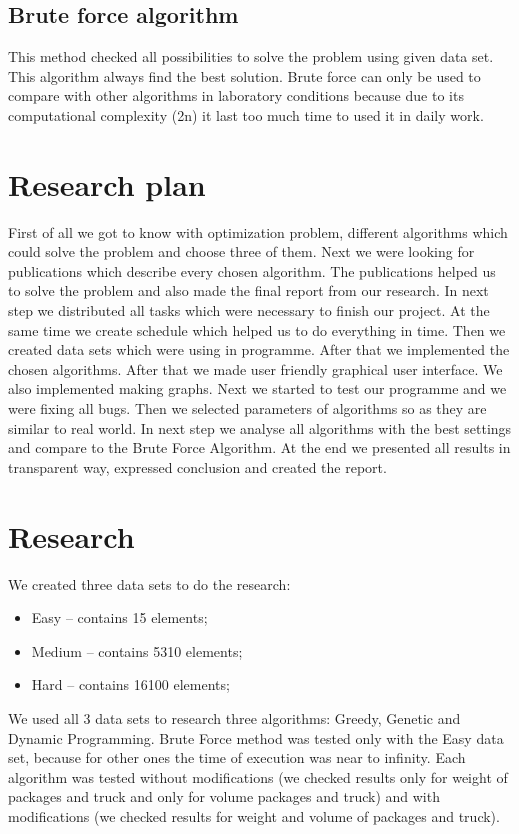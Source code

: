 \documentclass[conference,compsoc]{IEEEtran}
\begin{document}
\subsection{Brute force algorithm}
This method checked all possibilities to solve the problem using given data set. This algorithm always find the best solution. Brute force can only be used to compare with other algorithms in laboratory conditions because due to its computational complexity (2n) it last too much time to used it in daily work. 

\section{Research plan}
First of all we got to know with optimization problem, different algorithms which could solve the problem and choose three of them. Next we were looking for publications which describe every chosen algorithm. The publications helped us to solve the problem and also made the final report from our research. In next step we distributed all tasks which were necessary to finish our project. At the same time we create schedule which helped us to do everything in time. Then we created data sets which were using in programme. After that we implemented the chosen algorithms. After that we made user friendly graphical user interface. We also implemented making graphs. Next we started to test our programme and we were fixing all bugs. Then we selected parameters of algorithms so as they are similar to real world. In next step we analyse all algorithms with the best settings and compare to the Brute Force Algorithm. At the end we presented all results in transparent way, expressed conclusion and created the report.

\section{Research}
We created three data sets to do the research:
\begin{itemize}
\item Easy – contains 15 elements;
\item Medium – contains 5310 elements;
\item Hard – contains 16100 elements;
\end{itemize}
We used all 3 data sets to research three algorithms: Greedy, Genetic and Dynamic Programming.
Brute Force method was tested only with the Easy data set, because for other ones the time of execution was near to infinity.
Each algorithm was tested without modifications (we checked results only for weight of packages and truck and only for volume packages and truck) and with modifications (we checked results for weight and volume of packages and truck).
\end{document}
